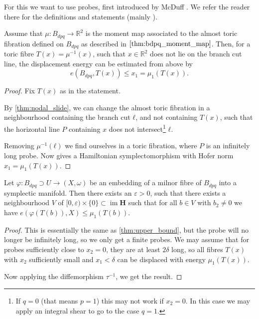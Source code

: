 \documentclass[12pt,a4paper,draft]{scrartcl}
\DeclareMathOperator{\im}{im}
\begin{document}
For this we want to use probes, first introduced by McDuff \cite{mcduff2011displacing}. We refer the reader there for the definitions and statements (mainly \cite[Definition 2.3, Lemma 2.4]{mcduff2011displacing}).


\begin{lemma}
    \label{thm:upper_bound}
    Assume that $\mu \colon B_{dpq} \to \mathbb{R}^2$ is the moment map associated to the almost toric fibration defined on $B_{dpq}$ as described in $\cref{thm:bdpq_moment_map}$. 
    Then, for a toric fibre $T(x)=\mu^{-1}(x)$, such that $x \in \mathbb{R}^2$ does not lie on the branch cut line, the displacement energy can be estimated from above by
    \[ e(B_{dpq},T(x))\leq x_1 = μ_1(T(x)). \]
\end{lemma}


\begin{proof}
  Fix $T(x)$ as in the statement.
  
By \cref{thm:nodal_slide}, we can change the almost toric fibration in a neighbourhood containing the branch cut $ℓ$, and not containing $T(x)$, such that the horizontal line $P$ containing $x$ does not intersect\footnote{If $q=0$ (that means $p=1$) this may not work if $x_2=0$. In this case we may apply an integral shear to go to the case $q=1$.} $ℓ$.

Removing $μ^{-1}(ℓ)$ we find ourselves in a toric fibration, where $P$ is an infinitely long probe. Now \cite[Lemma 2.4]{mcduff2011displacing} gives a Hamiltonian symplectomorphism with Hofer norm $x_1 = μ_1(T(x))$.
\end{proof}

\begin{proposition}
\label{thm:upper_bound_embedded}
  Let $φ:B_{dpq} ⊃ U → (X,ω)$ be an embedding of a milnor fibre of $B_{dpq}$ into a symplectic manifold.
  Then there exists an $ε>0$, such that there exists a neighbourhood $V$ of $[0,ε) × \{0\} ⊂ \im{\symbf{H}}$ such that for all $b ∈ V$ with $b_2 ≠ 0$ we have $e(φ(T(b)),X) \leq μ_1(T(b))$.
\end{proposition}

\begin{proof}
    This is essentially the same as \cref{thm:upper_bound}, but the probe will no longer be infinitely long, so we only get a finite probes.
    We may assume that for probes sufficiently close to $x_2=0$, they are at least $2δ$ long, so all fibres $T(x)$ with $x_2$ sufficiently small and $x_1<δ$ can be displaced with energy $μ_1(T(x))$.

    Now applying the diffemorphism $τ^{-1}$, we get the result.
\end{proof}
\end{document}
